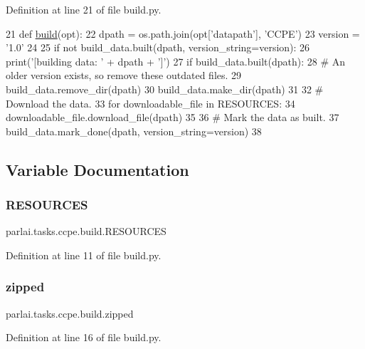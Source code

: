 Definition at line 21 of file build.\+py.


\begin{DoxyCode}
21 \textcolor{keyword}{def }\hyperlink{namespacedialog__babi__feedback_1_1build_a7a9d289f7493a5ded13c4b7f071b6184}{build}(opt):
22     dpath = os.path.join(opt[\textcolor{stringliteral}{'datapath'}], \textcolor{stringliteral}{'CCPE'})
23     version = \textcolor{stringliteral}{'1.0'}
24 
25     \textcolor{keywordflow}{if} \textcolor{keywordflow}{not} build\_data.built(dpath, version\_string=version):
26         print(\textcolor{stringliteral}{'[building data: '} + dpath + \textcolor{stringliteral}{']'})
27         \textcolor{keywordflow}{if} build\_data.built(dpath):
28             \textcolor{comment}{# An older version exists, so remove these outdated files.}
29             build\_data.remove\_dir(dpath)
30         build\_data.make\_dir(dpath)
31 
32         \textcolor{comment}{# Download the data.}
33         \textcolor{keywordflow}{for} downloadable\_file \textcolor{keywordflow}{in} RESOURCES:
34             downloadable\_file.download\_file(dpath)
35 
36         \textcolor{comment}{# Mark the data as built.}
37         build\_data.mark\_done(dpath, version\_string=version)
38 \end{DoxyCode}


\subsection{Variable Documentation}
\mbox{\label{namespaceparlai_1_1tasks_1_1ccpe_1_1build_a6a7c15b8accd9c13dc5a4781226de210}} 
\subsubsection{\texorpdfstring{R\+E\+S\+O\+U\+R\+C\+ES}{RESOURCES}}
{\footnotesize\ttfamily parlai.\+tasks.\+ccpe.\+build.\+R\+E\+S\+O\+U\+R\+C\+ES}



Definition at line 11 of file build.\+py.

\mbox{\label{namespaceparlai_1_1tasks_1_1ccpe_1_1build_a53415c3070df90c98065a01b2cc77606}} 
\subsubsection{\texorpdfstring{zipped}{zipped}}
{\footnotesize\ttfamily parlai.\+tasks.\+ccpe.\+build.\+zipped}



Definition at line 16 of file build.\+py.

